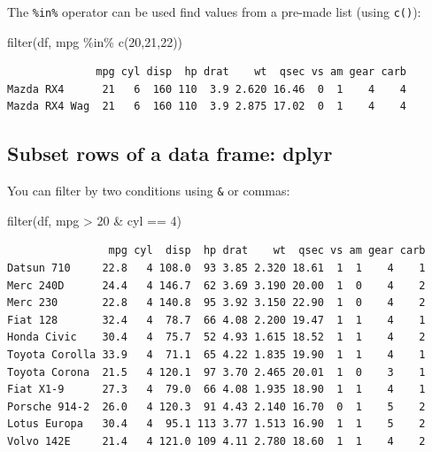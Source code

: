 \documentclass[
]{article}
\newenvironment{Shaded}{\begin{snugshade}}{\end{snugshade}}
\newcommand{\DecValTok}[1]{\textcolor[rgb]{0.00,0.00,0.81}{#1}}
\newcommand{\FunctionTok}[1]{\textcolor[rgb]{0.00,0.00,0.00}{#1}}
\newcommand{\NormalTok}[1]{#1}
\newcommand{\SpecialCharTok}[1]{\textcolor[rgb]{0.00,0.00,0.00}{#1}}
\begin{document}
The \texttt{\%in\%} operator can be used find values from a pre-made
list (using \texttt{c()}):

\begin{Shaded}
\begin{Highlighting}[]
\FunctionTok{filter}\NormalTok{(df, mpg }\SpecialCharTok{\%in\%} \FunctionTok{c}\NormalTok{(}\DecValTok{20}\NormalTok{,}\DecValTok{21}\NormalTok{,}\DecValTok{22}\NormalTok{))}
\end{Highlighting}
\end{Shaded}

\begin{verbatim}
              mpg cyl disp  hp drat    wt  qsec vs am gear carb
Mazda RX4      21   6  160 110  3.9 2.620 16.46  0  1    4    4
Mazda RX4 Wag  21   6  160 110  3.9 2.875 17.02  0  1    4    4
\end{verbatim}

\hypertarget{subset-rows-of-a-data-frame-dplyr-3}{%
\subsection{Subset rows of a data frame:
dplyr}\label{subset-rows-of-a-data-frame-dplyr-3}}

You can filter by two conditions using \texttt{\&} or commas:

\begin{Shaded}
\begin{Highlighting}[]
\FunctionTok{filter}\NormalTok{(df, mpg }\SpecialCharTok{\textgreater{}} \DecValTok{20} \SpecialCharTok{\&}\NormalTok{ cyl }\SpecialCharTok{==} \DecValTok{4}\NormalTok{)}
\end{Highlighting}
\end{Shaded}

\begin{verbatim}
                mpg cyl  disp  hp drat    wt  qsec vs am gear carb
Datsun 710     22.8   4 108.0  93 3.85 2.320 18.61  1  1    4    1
Merc 240D      24.4   4 146.7  62 3.69 3.190 20.00  1  0    4    2
Merc 230       22.8   4 140.8  95 3.92 3.150 22.90  1  0    4    2
Fiat 128       32.4   4  78.7  66 4.08 2.200 19.47  1  1    4    1
Honda Civic    30.4   4  75.7  52 4.93 1.615 18.52  1  1    4    2
Toyota Corolla 33.9   4  71.1  65 4.22 1.835 19.90  1  1    4    1
Toyota Corona  21.5   4 120.1  97 3.70 2.465 20.01  1  0    3    1
Fiat X1-9      27.3   4  79.0  66 4.08 1.935 18.90  1  1    4    1
Porsche 914-2  26.0   4 120.3  91 4.43 2.140 16.70  0  1    5    2
Lotus Europa   30.4   4  95.1 113 3.77 1.513 16.90  1  1    5    2
Volvo 142E     21.4   4 121.0 109 4.11 2.780 18.60  1  1    4    2
\end{verbatim}
\end{document}
